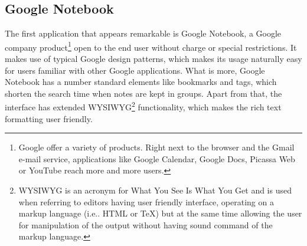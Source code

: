 \subsection{Google Notebook}\label{subsec:google_notebook}
The first application that appears remarkable is Google Notebook, a Google company product\footnote{Google offer a variety of products. Right next to the browser and the Gmail e-mail service, applications like Google Calendar, Google Docs, Picassa Web or YouTube reach more and more users.} open to the end user without charge or special restrictions. It makes use of typical Google design patterns, which makes its usage naturally easy for users familiar with other Google applications. What is more, Google Notebook has a number standard elements like bookmarks and tags, which shorten the search time when notes are kept in groups. Apart from that, the interface has extended WYSIWYG\footnote{WYSIWYG is an acronym for What You See Is What You Get and is used when referring to editors having user friendly interface, operating on a markup language (i.e.. HTML or \TeX) but at the same time allowing the user for manipulation of the output without having sound command of the markup language.} functionality, which makes the rich text formatting user friendly.

